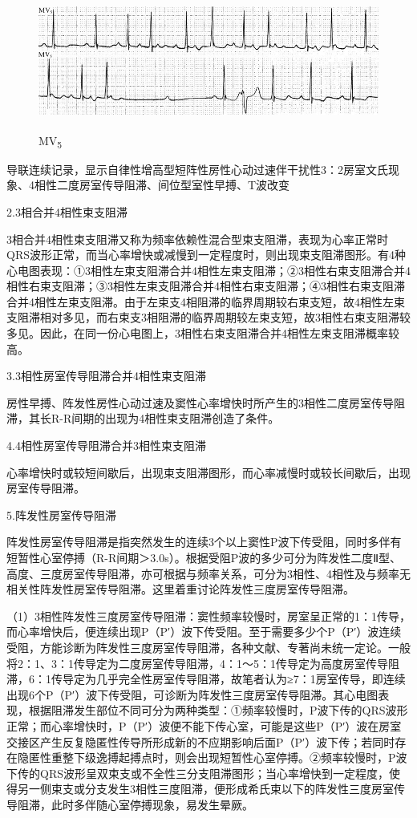 \begin{figure}[!htbp]
 \centering
 \includegraphics[width=5.58333in,height=1.78125in]{./images/Image00382.jpg}
 \captionsetup{justification=centering}
 \caption{MV\textsubscript{5}}
 \label{fig22-15}
  \end{figure} 
导联连续记录，显示自律性增高型短阵性房性心动过速伴干扰性3：2房室文氏现象、4相性二度房室传导阻滞、间位型室性早搏、T波改变

2.3相合并4相性束支阻滞

3相合并4相性束支阻滞又称为频率依赖性混合型束支阻滞，表现为心率正常时QRS波形正常，而当心率增快或减慢到一定程度时，则出现束支阻滞图形。有4种心电图表现：①3相性左束支阻滞合并4相性左束支阻滞；②3相性右束支阻滞合并4相性右束支阻滞；③3相性左束支阻滞合并4相性右束支阻滞；④3相性右束支阻滞合并4相性左束支阻滞。由于左束支4相阻滞的临界周期较右束支短，故4相性左束支阻滞相对多见，而右束支3相阻滞的临界周期较左束支短，故3相性右束支阻滞较多见。因此，在同一份心电图上，3相性右束支阻滞合并4相性左束支阻滞概率较高。

3.3相性房室传导阻滞合并4相性束支阻滞

房性早搏、阵发性房性心动过速及窦性心率增快时所产生的3相性二度房室传导阻滞，其长R-R间期的出现为4相性束支阻滞创造了条件。

4.4相性房室传导阻滞合并3相性束支阻滞

心率增快时或较短间歇后，出现束支阻滞图形，而心率减慢时或较长间歇后，出现房室传导阻滞。

5.阵发性房室传导阻滞

阵发性房室传导阻滞是指突然发生的连续3个以上窦性P波下传受阻，同时多伴有短暂性心室停搏（R-R间期＞3.0s）。根据受阻P波的多少可分为阵发性二度Ⅱ型、高度、三度房室传导阻滞，亦可根据与频率关系，可分为3相性、4相性及与频率无相关性阵发性房室传导阻滞。这里着重讨论阵发性三度房室传导阻滞。

（1）3相性阵发性三度房室传导阻滞：窦性频率较慢时，房室呈正常的1：1传导，而心率增快后，便连续出现P（P′）波下传受阻。至于需要多少个P（P′）波连续受阻，方能诊断为阵发性三度房室传导阻滞，各种文献、专著尚未统一定论。一般将2：1、3：1传导定为二度房室传导阻滞，4：1～5：1传导定为高度房室传导阻滞，6：1传导定为几乎完全性房室传导阻滞，故笔者认为≥7：1房室传导，即连续出现6个P（P′）波下传受阻，可诊断为阵发性三度房室传导阻滞。其心电图表现，根据阻滞发生部位不同可分为两种类型：①频率较慢时，P波下传的QRS波形正常；而心率增快时，P（P′）波便不能下传心室，可能是这些P（P′）波在房室交接区产生反复隐匿性传导所形成新的不应期影响后面P（P′）波下传；若同时存在隐匿性重整下级逸搏起搏点时，则会出现短暂性心室停搏。②频率较慢时，P波下传的QRS波形呈双束支或不全性三分支阻滞图形；当心率增快到一定程度，使得另一侧束支或分支发生3相性三度阻滞，便形成希氏束以下的阵发性三度房室传导阻滞，此时多伴随心室停搏现象，易发生晕厥。

